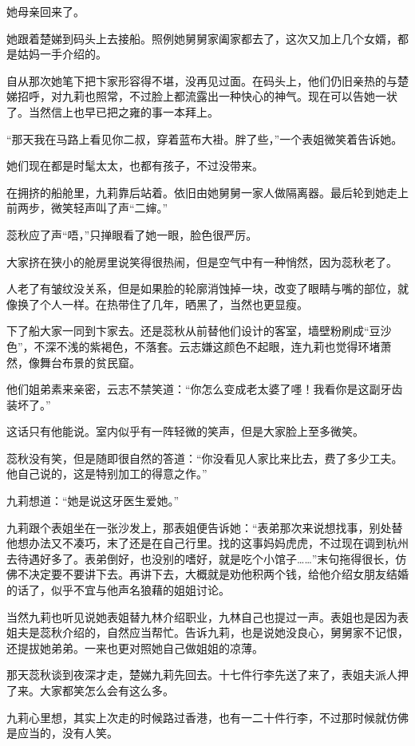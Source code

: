 \par 她母亲回来了。
\par 她跟着楚娣到码头上去接船。照例她舅舅家阖家都去了，这次又加上几个女婿，都是姑妈一手介绍的。
\par 自从那次她笔下把卞家形容得不堪，没再见过面。在码头上，他们仍旧亲热的与楚娣招呼，对九莉也照常，不过脸上都流露出一种快心的神气。现在可以告她一状了。当然信上也早已把之雍的事一本拜上。
\par “那天我在马路上看见你二叔，穿着蓝布大褂。胖了些，”一个表姐微笑着告诉她。
\par 她们现在都是时髦太太，也都有孩子，不过没带来。
\par 在拥挤的船舱里，九莉靠后站着。依旧由她舅舅一家人做隔离器。最后轮到她走上前两步，微笑轻声叫了声“二婶。”
\par 蕊秋应了声“唔，”只掸眼看了她一眼，脸色很严厉。
\par 大家挤在狭小的舱房里说笑得很热闹，但是空气中有一种悄然，因为蕊秋老了。
\par 人老了有皱纹没关系，但是如果脸的轮廓消蚀掉一块，改变了眼睛与嘴的部位，就像换了个人一样。在热带住了几年，晒黑了，当然也更显瘦。
\par 下了船大家一同到卞家去。还是蕊秋从前替他们设计的客室，墙壁粉刷成“豆沙色”，不深不浅的紫褐色，不落套。云志嫌这颜色不起眼，连九莉也觉得环堵萧然，像舞台布景的贫民窟。
\par 他们姐弟素来亲密，云志不禁笑道：“你怎么变成老太婆了嚜！我看你是这副牙齿装坏了。”
\par 这话只有他能说。室内似乎有一阵轻微的笑声，但是大家脸上至多微笑。
\par 蕊秋没有笑，但是随即很自然的答道：“你没看见人家比来比去，费了多少工夫。他自己说的，这是特别加工的得意之作。”
\par 九莉想道：“她是说这牙医生爱她。”
\par 九莉跟个表姐坐在一张沙发上，那表姐便告诉她：“表弟那次来说想找事，别处替他想办法又不凑巧，末了还是在自己行里。找的这事妈妈虎虎，不过现在调到杭州去待遇好多了。表弟倒好，也没别的嗜好，就是吃个小馆子……”末句拖得很长，仿佛不决定要不要讲下去。再讲下去，大概就是劝他积两个钱，给他介绍女朋友结婚的话了，似乎不宜与他声名狼藉的姐姐讨论。
\par 当然九莉也听见说她表姐替九林介绍职业，九林自己也提过一声。表姐也是因为表姐夫是蕊秋介绍的，自然应当帮忙。告诉九莉，也是说她没良心，舅舅家不记恨，还提拔她弟弟。一来也更对照她自己做姐姐的凉薄。
\par 那天蕊秋谈到夜深才走，楚娣九莉先回去。十七件行李先送了来了，表姐夫派人押了来。大家都笑怎么会有这么多。
\par 九莉心里想，其实上次走的时候路过香港，也有一二十件行李，不过那时候就仿佛是应当的，没有人笑。
